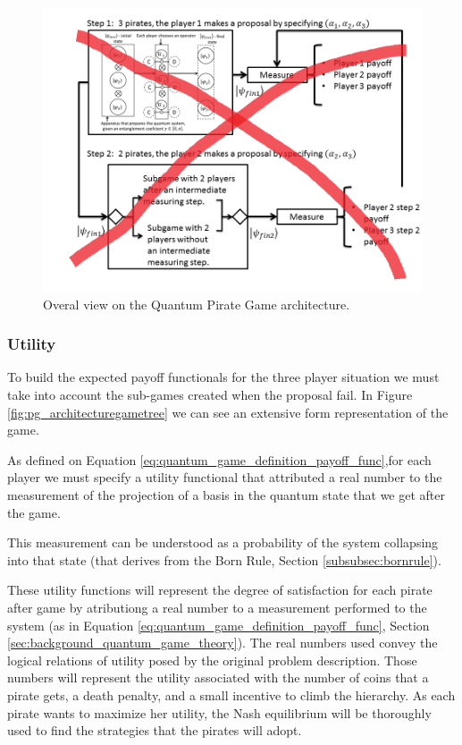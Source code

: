 \begin{figure}[h]
\centering 
\includegraphics[scale=0.55]{Figures/architecture/esquema/Slide5.png}
\caption{Overal view on the Quantum Pirate Game architecture. }
\label{fig:pg_architecture3players_architecture}
\end{figure}

\subsubsection{Utility}
\label{subsec:pirates_utility}

To build the expected payoff functionals for the three player situation we must take into account the sub-games created when the proposal fail. In Figure \ref{fig:pg_architecturegametree} we can see an extensive form representation of the game.



As defined on Equation \ref{eq:quantum_game_definition_payoff_func},for each player we must specify a utility functional that attributed a real number to the measurement of the projection of a basis in the quantum state that we get after the game. 


This measurement can be understood as a probability of the system collapsing into that state (that derives from the Born Rule, Section \ref{subsubsec:bornrule}).


These utility functions will represent the degree of satisfaction for each pirate after game by atributiong a real number to a measurement performed to the system (as in Equation \ref{eq:quantum_game_definition_payoff_func}, Section \ref{sec:background_quantum_game_theory}). 
The real numbers used convey the logical relations of utility posed by the original problem description. Those numbers will represent the utility associated with the number of coins that a pirate gets, a death penalty, and a small incentive to climb the hierarchy. As each pirate wants to maximize her utility, the Nash equilibrium will be thoroughly used to find the strategies that the pirates will adopt\cite{nash50}\cite{Nash51}.

